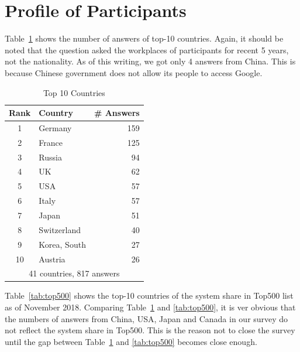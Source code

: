 \documentclass[submit,techrep,noauthor,english]{ipsj}
\begin{document}
\section{Profile of Participants}\label{sec:profile}

Table~\ref{tab:countries} shows the number of answers of top-10
countries. Again, it should be noted that the question asked the
workplaces of participants for recent 5 years, not the nationality. As
of this writing, we got only 4 answers from China. This is because
Chinese government does not allow its people to access Google. 

\begin{table}[htb]%
\begin{center}%
\caption{Top 10 Countries}\label{tab:countries}%
\begin{tabular}{c|l|r}%
\hline%
Rank & Country & \# Answers \hspace{5mm} \\%
\hline%
1 & Germany 	& 159 \hspace{8mm} \\%
2 & France 	& 125 \hspace{8mm} \\%
3 & Russia 	& 94 \hspace{8mm} \\%
4 & UK 		& 62 \hspace{8mm} \\%
5 & USA 	& 57 \hspace{8mm} \\%
6 & Italy 	& 57 \hspace{8mm} \\%
7 & Japan 	& 51 \hspace{8mm} \\%
\hline
8 & Switzerland & 40 \hspace{8mm} \\%
9 & Korea, South & 27 \hspace{8mm} \\%
10 & Austria 	& 26 \hspace{8mm} \\%
\hline%
\multicolumn{3}{c}{41 countries, 817 answers} \\%
\end{tabular}%
\end{center}%
\end{table}%

Table~\ref{tab:top500} shows the top-10 countries of the system share
in Top500 list as of November 2018\cite{Top500}. Comparing
Table~\ref{tab:countries} and \ref{tab:top500}, it is ver obvious that
the numbers of answers from China, USA, Japan and Canada in our survey
do not reflect the system share in Top500.  This is the reason not to
close the survey until the gap between Table~\ref{tab:countries} and
\ref{tab:top500} becomes close enough.
\end{document}
